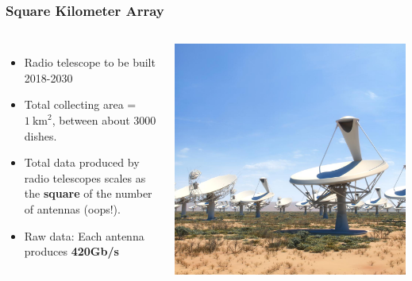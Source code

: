 \documentclass[10pt, compress]{beamer}
\begin{document}
\begin{frame}[fragile]
    \frametitle{Square Kilometer Array}
    \begin{columns}
    		\begin{itemize}
        		\item Radio telescope to be built 2018-2030
        		\item Total collecting area = $1~\mathrm{km}^2$, between about 3000 dishes.
        		\item Total data produced by radio telescopes scales as the \textbf{square} of the number of antennas (oops!).
        		\item Raw data: Each antenna produces \textbf{420Gb/s}
    		\end{itemize}
    		\includegraphics[height=\textheight]{assets/ska_dish_mid_africa_closeup.jpg}
    \end{columns}
\end{frame}
\end{document}
